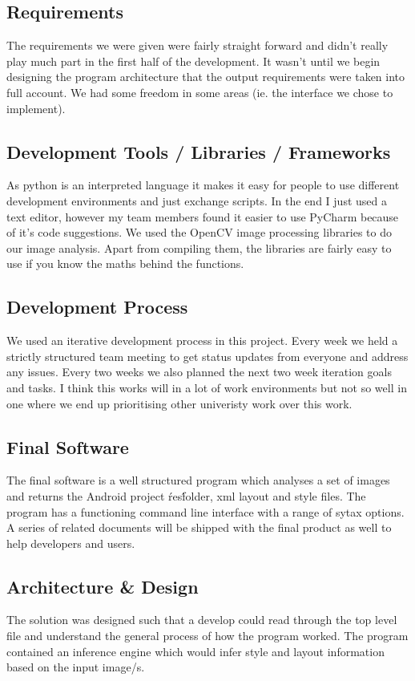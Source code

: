 \documentclass{article}
\begin{document}
\subsection{Requirements}
The requirements we were given were fairly straight forward and didn't really play much part in the first half of the development. It wasn't until we begin designing the program architecture that the output requirements were taken into full account. We had some freedom in some areas (ie. the interface we chose to implement).

\subsection{Development Tools / Libraries / Frameworks}
As python is an interpreted language it makes it easy for people to use different development environments and just exchange scripts. In the end I just used a text editor, however my team members found it easier to use PyCharm because of it's code suggestions. We used the OpenCV image processing libraries to do our image analysis. Apart from compiling them, the libraries are fairly easy to use if you know the maths behind the functions.

\subsection{Development Process}
We used an iterative development process in this project. Every week we held a strictly structured team meeting to get status updates from everyone and address any issues. Every two weeks we also planned the next two week iteration goals and tasks. I think this works will in a lot of work environments but not so well in one where we end up prioritising other univeristy work over this work.

\subsection{Final Software}
The final software is a well structured program which analyses a set of images and returns the Android project \'res\' folder, xml layout and style files. The program has a functioning command line interface with a range of sytax options. A series of related documents will be shipped with the final product as well to help developers and users.

\subsection{Architecture \& Design}
The solution was designed such that a develop could read through the top level file and understand the general process of how the program worked. The program contained an inference engine which would infer style and layout information based on the input image/s.
\end{document}
